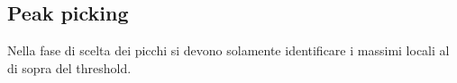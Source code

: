   \subsection{Peak picking}
    Nella fase di scelta dei picchi si devono solamente identificare i massimi locali al di sopra del threshold. 






 

